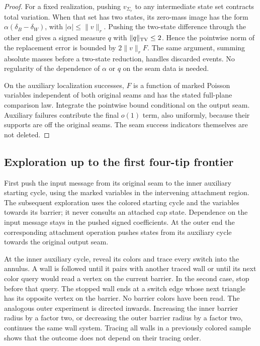 \begin{proof}
For a fixed realization, pushing $v_{\Sigma_r}$ to any intermediate
state set contracts total variation.  When that set has two states, its
zero-mass image has the form $\alpha(\delta_B-\delta_W)$, with
$|\alpha|\le\|v\|_r$.  Pushing the two-state difference through the other
end gives a signed measure $q$ with $\|q\|_{\mathrm{TV}}\le2$.  Hence the
pointwise norm of the replacement error is bounded by
$2\|v\|_rF$.  The same argument, summing absolute masses before a
two-state reduction, handles discarded events.  No regularity of the
dependence of $\alpha$ or $q$ on the seam data is needed.

On the auxiliary localization successes, $F$ is a function of marked
Poisson variables independent of both original seams and has the stated
full-plane comparison law.  Integrate the pointwise bound conditional
on the output seam.  Auxiliary failures contribute the final $o(1)$
term, also uniformly, because their supports are off the original seams.
The seam success indicators themselves are not deleted.
\end{proof}

\subsection{Exploration up to the first four-tip frontier}

First push the input message from its original seam to the inner
auxiliary starting cycle, using the marked variables in the intervening
attachment region.  The subsequent exploration uses the colored
starting cycle and the variables towards its barrier; it never consults
an attached cap state.  Dependence on the input message stays in the
pushed signed coefficients.  At the outer end the corresponding
attachment operation pushes states from its auxiliary cycle towards
the original output seam.

At the inner auxiliary cycle, reveal its colors and trace every switch
into the annulus.  A wall is followed until it pairs with another traced
wall or until its next color query would read a vertex on the current
barrier.  In the second case, stop before that query.  The stopped wall
ends at a switch edge whose next triangle has its opposite vertex on
the barrier.  No barrier colors have been read.  The analogous outer
experiment is directed inwards.  Increasing the inner barrier radius
by a factor two, or decreasing the outer barrier radius by a factor
two, continues the same wall system.  Tracing all walls in a previously
colored sample shows that the outcome does not depend on their tracing
order.

